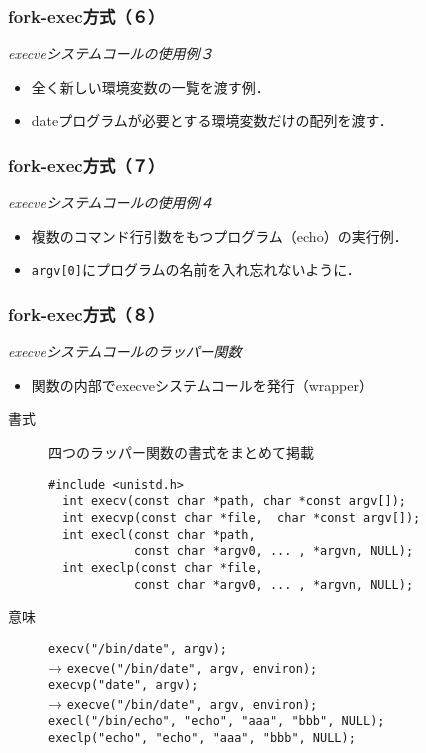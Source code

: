 \documentclass{beamer}                 %
\begin{document}
\begin{frame}[fragile]
  \frametitle{fork-exec方式（６）}
  \emph{execveシステムコールの使用例３} \\
  \begin{itemize}
  \item 全く新しい環境変数の一覧を渡す例．
  \item dateプログラムが必要とする環境変数だけの配列を渡す．
  \end{itemize}
  \vfill
\end{frame}

\begin{frame}[fragile]
  \frametitle{fork-exec方式（７）}
  \emph{execveシステムコールの使用例４} \\
  \begin{itemize}
  \item 複数のコマンド行引数をもつプログラム（echo）の実行例．
  \item \texttt{argv[0]}にプログラムの名前を入れ忘れないように．
  \end{itemize}
  \vfill
\end{frame}

\begin{frame}[fragile]
  \frametitle{fork-exec方式（８）}
  \emph{execveシステムコールのラッパー関数} \\
  \begin{itemize}
  \item 関数の内部でexecveシステムコールを発行（wrapper）
  \end{itemize}
  \begin{description}
  \item[書式] 四つのラッパー関数の書式をまとめて掲載
\begin{lstlisting}[numbers=none]
  #include <unistd.h>
  int execv(const char *path, char *const argv[]);
  int execvp(const char *file,  char *const argv[]);
  int execl(const char *path,
            const char *argv0, ... , *argvn, NULL);
  int execlp(const char *file,
            const char *argv0, ... , *argvn, NULL);
\end{lstlisting}
  \item[意味] \texttt{execv("/bin/date", argv);} \\
    →  \texttt{execve("/bin/date", argv, environ);} \\
    \texttt{execvp("date", argv);} \\
    →  \texttt{execve("/bin/date", argv, environ);} \\
    \texttt{execl("/bin/echo", "echo", "aaa", "bbb", NULL);} \\
    \texttt{execlp("echo", "echo", "aaa", "bbb", NULL);} \\
  \end{description}
  \vfill
\end{frame}
\end{document}
